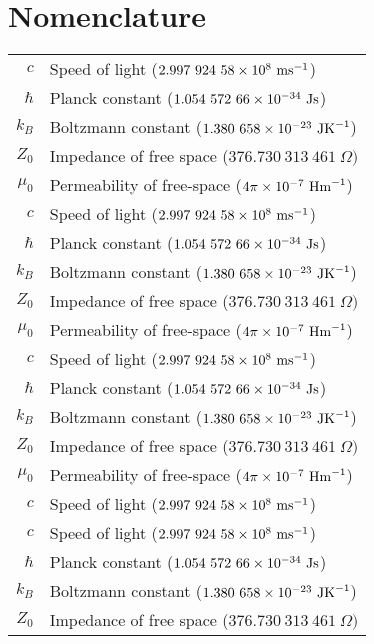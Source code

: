 \chapter*{Nomenclature}

\begin{longtable}{rl}
    $c$     & Speed of light ($2.997\ 924\ 58 \times 10^{8}\ \mbox{ms}^{-1}$)    \\
    $\hbar$ & Planck constant ($1.054\ 572\ 66\times 10^{-34}\ \mbox{Js}$)       \\
    $k_B$   & Boltzmann constant  ($1.380\ 658\times 10^{-23}\ \mbox{JK}^{-1} $) \\
    $Z_0$   & Impedance of free space  ($376.730\ 313\ 461\ \Omega) $    \\
    $\mu_0$ & Permeability of free-space ($4\pi\times 10^{-7}\ \mbox{Hm}^{-1}$)  \\
    $c$     & Speed of light ($2.997\ 924\ 58 \times 10^{8}\ \mbox{ms}^{-1}$)    \\
    $\hbar$ & Planck constant ($1.054\ 572\ 66\times 10^{-34}\ \mbox{Js}$)       \\
    $k_B$   & Boltzmann constant  ($1.380\ 658\times 10^{-23}\ \mbox{JK}^{-1} $) \\
    $Z_0$   & Impedance of free space  ($376.730\ 313\ 461\ \Omega) $    \\
    $\mu_0$ & Permeability of free-space ($4\pi\times 10^{-7}\ \mbox{Hm}^{-1}$)  \\
    $c$     & Speed of light ($2.997\ 924\ 58 \times 10^{8}\ \mbox{ms}^{-1}$)    \\
    $\hbar$ & Planck constant ($1.054\ 572\ 66\times 10^{-34}\ \mbox{Js}$)       \\
    $k_B$   & Boltzmann constant  ($1.380\ 658\times 10^{-23}\ \mbox{JK}^{-1} $) \\
    $Z_0$   & Impedance of free space  ($376.730\ 313\ 461\ \Omega) $    \\
    $\mu_0$ & Permeability of free-space ($4\pi\times 10^{-7}\ \mbox{Hm}^{-1}$)  \\
    $c$     & Speed of light ($2.997\ 924\ 58 \times 10^{8}\ \mbox{ms}^{-1}$)    \\
    $c$     & Speed of light ($2.997\ 924\ 58 \times 10^{8}\ \mbox{ms}^{-1}$)    \\
    $\hbar$ & Planck constant ($1.054\ 572\ 66\times 10^{-34}\ \mbox{Js}$)       \\
    $k_B$   & Boltzmann constant  ($1.380\ 658\times 10^{-23}\ \mbox{JK}^{-1} $) \\
    $Z_0$   & Impedance of free space  ($376.730\ 313\ 461\ \Omega) $    \\

\end{longtable}
